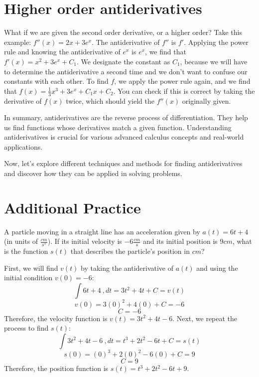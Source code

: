 \section{Higher order antiderivatives}
What if we are given the second order derivative, or a higher order? 
Take this example: $f''(x) = 2x+3e^x$. The antiderivative of $f''$ is 
$f'$. Applying the power rule and knowing the antiderivative of $e^x$ 
is $e^x$, we find that $f'(x) = x^2 + 3e^x + C_1$. We designate the 
constant as $C_1$, because we will have to determine the antiderivative a 
second time and we don't want to confuse our constants with each other.
 To find $f$, we apply the power rule again, and we find that $f(x) = 
\frac{1}{3} x^3 + 3e^x + C_1x + C_2$. You can check if this is correct 
by taking the derivative of $f(x)$ twice, which should yield the 
$f''(x)$ originally given. 

In summary, antiderivatives are the reverse process of
differentiation. They help us find functions whose derivatives match a
given function. Understanding antiderivatives is crucial for various
advanced calculus concepts and real-world applications.

Now, let's explore different techniques and methods for finding
antiderivatives and discover how they can be applied in solving
problems.

\section{Additional Practice}

\begin{Exercise}[label=antideriv1]
	A particle moving in a straight line has an acceleration given by 
	$a(t) = 6t + 4$ (in units of $\frac{cm}{s^s}$). If its initial 
	velocity is $-6 \frac{cm}{s}$ and its initial position is $9 cm$, 
	what is the function $s(t)$ that describes the particle's position 
	in $cm$?
\end{Exercise}

\begin{Answer}[ref=antideriv1]
	First, we will find $v(t)$ by taking the antiderivative of $a(t)$ and 
	using the initial condition $v(0) = -6$:
	$$\int 6t + 4 \ , dt = 3t^2 + 4t + C = v(t)$$
	$$v(0) = 3(0)^2 + 4(0) + C = -6$$
	$$C = -6$$
	Therefore, the velocity function is $v(t) = 3t^2 + 4t - 6$. Next, we 
	repeat the process to find $s(t)$:
	$$\int 3t^2 + 4t - 6 \ , dt = t^3 + 2t^2 - 6t + C = s(t)$$
	$$s(0) = (0)^3 + 2(0)^2 - 6(0) + C = 9$$
	$$C = 9$$
	Therefore, the position function is $s(t) = t^3 + 2t^2 - 6t + 9$. 
\end{Answer}

